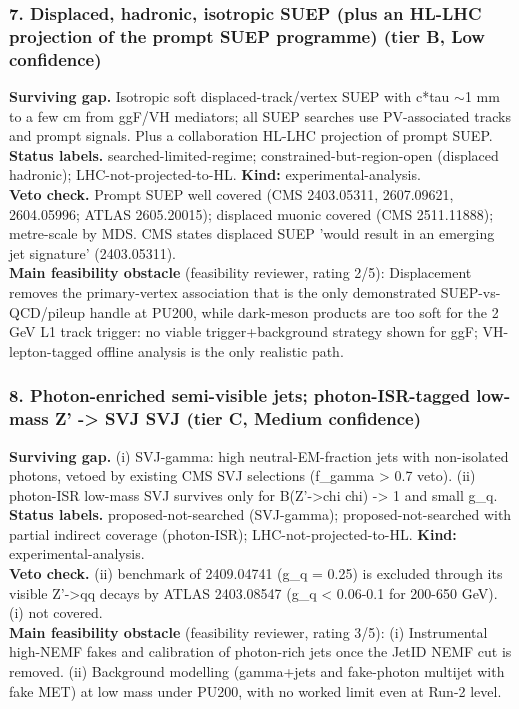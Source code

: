 \documentclass[11pt,a4paper]{article}
\begin{document}
\subsubsection*{7. Displaced, hadronic, isotropic SUEP (plus an HL-LHC projection of the prompt SUEP programme) (tier B, Low confidence)}
\textbf{Surviving gap.} Isotropic soft displaced-track/vertex SUEP with c*tau $\sim$1 mm to a few cm from ggF/VH mediators; all SUEP searches use PV-associated tracks and prompt signals. Plus a collaboration HL-LHC projection of prompt SUEP.\\
\textbf{Status labels.} searched-limited-regime; constrained-but-region-open (displaced hadronic); LHC-not-projected-to-HL. \textbf{Kind:} experimental-analysis.\\
\textbf{Veto check.} Prompt SUEP well covered (CMS 2403.05311, 2607.09621, 2604.05996; ATLAS 2605.20015); displaced muonic covered (CMS 2511.11888); metre-scale by MDS. CMS states displaced SUEP 'would result in an emerging jet signature' (2403.05311).
\\\textbf{Main feasibility obstacle} (feasibility reviewer, rating 2/5): Displacement removes the primary-vertex association that is the only demonstrated SUEP-vs-QCD/pileup handle at PU200, while dark-meson products are too soft for the 2 GeV L1 track trigger: no viable trigger+background strategy shown for ggF; VH-lepton-tagged offline analysis is the only realistic path.

\subsubsection*{8. Photon-enriched semi-visible jets; photon-ISR-tagged low-mass Z' -> SVJ SVJ (tier C, Medium confidence)}
\textbf{Surviving gap.} (i) SVJ-gamma: high neutral-EM-fraction jets with non-isolated photons, vetoed by existing CMS SVJ selections (f\_gamma > 0.7 veto). (ii) photon-ISR low-mass SVJ survives only for B(Z'->chi chi) -> 1 and small g\_q.\\
\textbf{Status labels.} proposed-not-searched (SVJ-gamma); proposed-not-searched with partial indirect coverage (photon-ISR); LHC-not-projected-to-HL. \textbf{Kind:} experimental-analysis.\\
\textbf{Veto check.} (ii) benchmark of 2409.04741 (g\_q = 0.25) is excluded through its visible Z'->qq decays by ATLAS 2403.08547 (g\_q < 0.06-0.1 for 200-650 GeV). (i) not covered.
\\\textbf{Main feasibility obstacle} (feasibility reviewer, rating 3/5): (i) Instrumental high-NEMF fakes and calibration of photon-rich jets once the JetID NEMF cut is removed. (ii) Background modelling (gamma+jets and fake-photon multijet with fake MET) at low mass under PU200, with no worked limit even at Run-2 level.
\end{document}
